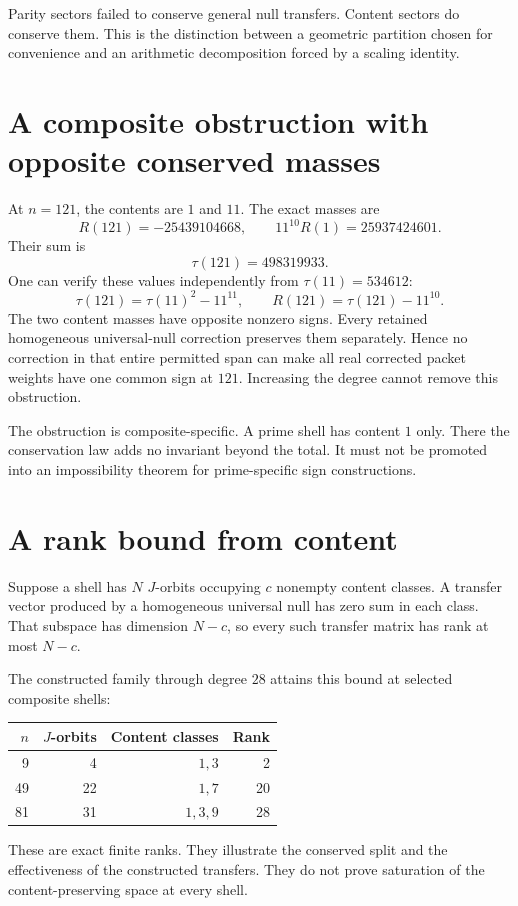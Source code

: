 Parity sectors failed to conserve general null transfers. Content sectors do conserve them. This is the distinction between a geometric partition chosen for convenience and an arithmetic decomposition forced by a scaling identity.

\section{A composite obstruction with opposite conserved masses}
At $n=121$, the contents are $1$ and $11$. The exact masses are
\[
R(121)=-25439104668,\qquad11^{10}R(1)=25937424601.
\]
Their sum is
\[
\tau(121)=498319933.
\]
One can verify these values independently from $\tau(11)=534612$:
\[
\tau(121)=\tau(11)^2-11^{11},\qquad
R(121)=\tau(121)-11^{10}.
\]
The two content masses have opposite nonzero signs. Every retained homogeneous universal-null correction preserves them separately. Hence no correction in that entire permitted span can make all real corrected packet weights have one common sign at $121$. Increasing the degree cannot remove this obstruction.

The obstruction is composite-specific. A prime shell has content $1$ only. There the conservation law adds no invariant beyond the total. It must not be promoted into an impossibility theorem for prime-specific sign constructions.


\section{A rank bound from content}
Suppose a shell has $N$ $J$-orbits occupying $c$ nonempty content classes. A transfer vector produced by a homogeneous universal null has zero sum in each class. That subspace has dimension $N-c$, so every such transfer matrix has rank at most $N-c$.

The constructed family through degree $28$ attains this bound at selected composite shells:
\begin{center}
\begin{tabular}{rrrr}
\toprule
$n$&$J$-orbits&Content classes&Rank\\
\midrule
9&4&$1,3$&2\\
49&22&$1,7$&20\\
81&31&$1,3,9$&28\\
\bottomrule
\end{tabular}
\end{center}
These are exact finite ranks. They illustrate the conserved split and the effectiveness of the constructed transfers. They do not prove saturation of the content-preserving space at every shell.

